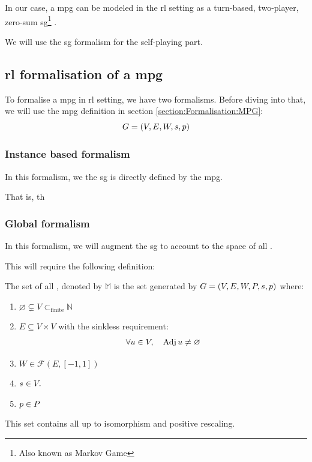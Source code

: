 In our case, a \acrshort{mpg} can be modeled in the \acrshort{rl} setting as a turn-based, two-player, zero-sum \acrfull{sg}\footnote{Also known as Markov Game} \cite{StochasticGames}.

We will use the \acrshort{sg} formalism for the self-playing part.
\subsection{\acrshort{rl} formalisation of a \acrshort{mpg}}
To formalise a \acrshort{mpg} in \acrshort{rl} setting, we have two formalisms. Before diving into that, we will use the \acrshort{mpg} definition in section \ref{section:Formalisation:MPG}:
\begin{equation*}
	G=(V,E,W,s,p)
\end{equation*}

\subsubsection{Instance based formalism}
In this formalism, we the \acrshort{sg} is directly defined by the \acrshort{mpg}.

That is, th

\subsubsection{Global formalism}
In this formalism, we will augment the \acrshort{sg} to account to the space of all .

This will require the following definition:
\begin{definition}
	The set of all , denoted by $\mathbb{M}$ is the set generated by $G=(V,E,W,P,s,p)$ where:
	\begin{enumerate}
		\item $\varnothing\subsetneq V \subset_{\text{finite}} \mathbb{N}$
		\item $E \subseteq V\times V$ with the sinkless requirement:
		\begin{equation*}
			\forall u \in V,\quad \operatorname{Adj} u \neq \varnothing
		\end{equation*}
		\item $W\in\mathscr{F}(E,[-1,1])$
		\item $s\in V.$
		\item $p\in P$
	\end{enumerate}
\end{definition}
	This set contains all  up to isomorphism and positive rescaling.
	
